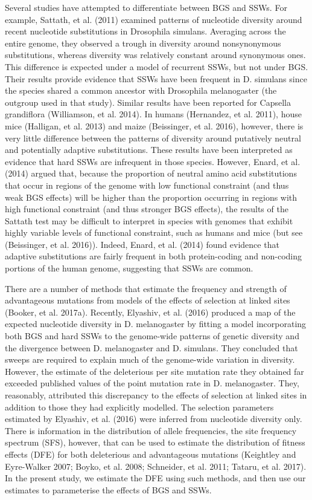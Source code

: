 	Several studies have attempted to differentiate between BGS and SSWs. For example, Sattath, et al. (2011) examined patterns of nucleotide diversity around recent nucleotide substitutions in Drosophila simulans. Averaging across the entire genome, they observed a trough in diversity around nonsynonymous substitutions, whereas diversity was relatively constant around synonymous ones. This difference is expected under a model of recurrent SSWs, but not under BGS. Their results provide evidence that SSWs have been frequent in D. simulans since the species shared a common ancestor with Drosophila melanogaster (the outgroup used in that study). Similar results have been reported for Capsella grandiflora (Williamson, et al. 2014). In humans (Hernandez, et al. 2011), house mice (Halligan, et al. 2013) and maize (Beissinger, et al. 2016), however, there is very little difference between the patterns of diversity around putatively neutral and potentially adaptive substitutions. These results have been interpreted as evidence that hard SSWs are infrequent in those species. However, Enard, et al. (2014) argued that, because the proportion of neutral amino acid substitutions that occur in regions of the genome with low functional constraint (and thus weak BGS effects) will be higher than the proportion occurring in regions with high functional constraint (and thus stronger BGS effects), the results of the Sattath test may be difficult to interpret in species with genomes that exhibit highly variable levels of functional constraint, such as humans and mice (but see (Beissinger, et al. 2016)). Indeed, Enard, et al. (2014) found evidence that adaptive substitutions are fairly frequent in both protein-coding and non-coding portions of the human genome, suggesting that SSWs are common.

There are a number of methods that estimate the frequency and strength of advantageous mutations from models of the effects of selection at linked sites (Booker, et al. 2017a). Recently, Elyashiv, et al. (2016) produced a map of the expected nucleotide diversity in D. melanogaster by fitting a model incorporating both BGS and hard SSWs to the genome-wide patterns of genetic diversity and the divergence between D. melanogaster and D. simulans. They concluded that sweeps are required to explain much of the genome-wide variation in diversity. However, the estimate of the deleterious per site mutation rate they obtained far exceeded published values of the point mutation rate in D. melanogaster. They, reasonably, attributed this discrepancy to the effects of selection at linked sites in addition to those they had explicitly modelled. The selection parameters estimated by Elyashiv, et al. (2016) were inferred from nucleotide diversity only. There is information in the distribution of allele frequencies, the site frequency spectrum (SFS), however, that can be used to estimate the distribution of fitness effects (DFE) for both deleterious and advantageous mutations (Keightley and Eyre-Walker 2007; Boyko, et al. 2008; Schneider, et al. 2011; Tataru, et al. 2017). In the present study, we estimate the DFE using such methods, and then use our estimates to parameterise the effects of BGS and SSWs. 

